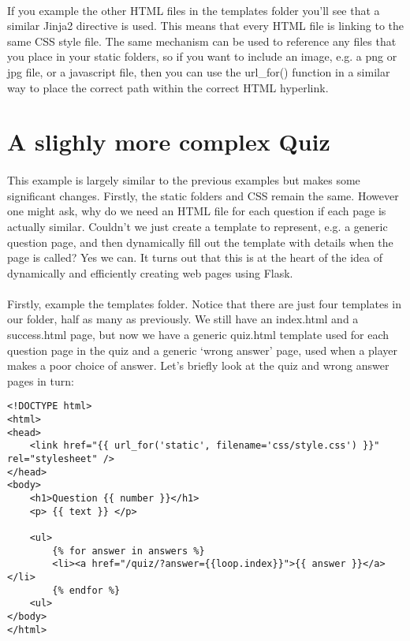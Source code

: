 \paragraph{} If you example the other HTML files in the templates folder you'll see that a similar Jinja2 directive is used. This means that every HTML file is linking to the same CSS style file. The same mechanism can be used to reference any files that you place in your static folders, so if you want to include an image, e.g. a png or jpg file, or a javascript file, then you can use the url\_for() function in a similar way to place the correct path within the correct HTML hyperlink.


\section{A slighly more complex Quiz}
\paragraph{} This example is largely similar to the previous examples but makes some significant changes. Firstly, the static folders and CSS remain the same. However one might ask, why do we need an HTML file for each question if each page is actually similar. Couldn't we just create a template to represent, e.g. a generic question page, and then dynamically fill out the template with details when the page is called? Yes we can. It turns out that this is at the heart of the idea of dynamically and efficiently creating web pages using Flask.

\paragraph{} Firstly, example the templates folder. Notice that there are just four templates in our folder, half as many as previously. We still have an index.html and a success.html page, but now we have a generic quiz.html template used for each question page in the quiz and a generic `wrong answer' page, used when a player makes a poor choice of answer. Let's briefly look at the quiz and wrong answer pages in turn:


\begin{lstlisting}
<!DOCTYPE html>
<html>
<head>
    <link href="{{ url_for('static', filename='css/style.css') }}" rel="stylesheet" />
</head>
<body>
    <h1>Question {{ number }}</h1>
    <p> {{ text }} </p>

    <ul>
        {% for answer in answers %}
        <li><a href="/quiz/?answer={{loop.index}}">{{ answer }}</a></li> 
        {% endfor %}
    <ul>
</body>
</html>

\end{lstlisting}

